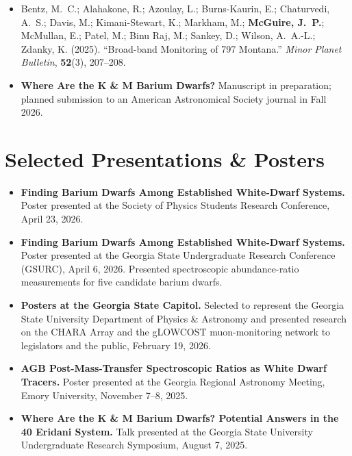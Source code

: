 \documentclass[10pt,a4paper]{article}
\newenvironment{items}
  {\begin{itemize}[leftmargin=1.2em,itemsep=0.6pt,topsep=1.5pt,parsep=0pt,
                   label=\textbullet]}
  {\end{itemize}}
\begin{document}
\begin{items}
  \item Bentz, M.~C.; Alahakone, R.; Azoulay, L.; Burns-Kaurin, E.; Chaturvedi, A.~S.;
        Davis, M.; Kimani-Stewart, K.; Markham, M.; \textbf{McGuire, J.~P.}; McMullan, E.;
        Patel, M.; Binu Raj, M.; Sankey, D.; Wilson, A.~A.-L.; Zdanky, K. (2025).
        ``Broad-band Monitoring of 797 Montana.'' \textit{Minor Planet Bulletin},
        \textbf{52}(3), 207--208.
  \item \textbf{Where Are the K \& M Barium Dwarfs?} Manuscript in preparation; planned
        submission to an American Astronomical Society journal in Fall 2026.
\end{items}

\section{Selected Presentations \& Posters}

\begin{items}
  \item \textbf{Finding Barium Dwarfs Among Established White-Dwarf Systems.} Poster
        presented at the Society of Physics Students Research Conference,
        April 23, 2026.
  \item \textbf{Finding Barium Dwarfs Among Established White-Dwarf Systems.} Poster
        presented at the Georgia State Undergraduate Research Conference (GSURC),
        April 6, 2026. Presented spectroscopic abundance-ratio measurements for five
        candidate barium dwarfs.
  \item \textbf{Posters at the Georgia State Capitol.} Selected to represent the Georgia
        State University Department of Physics \& Astronomy and presented research on the
        CHARA Array and the gLOWCOST muon-monitoring network to legislators and the
        public, February 19, 2026.
  \item \textbf{AGB Post-Mass-Transfer Spectroscopic Ratios as White Dwarf Tracers.}
        Poster presented at the Georgia Regional Astronomy Meeting, Emory University,
        November 7--8, 2025.
  \item \textbf{Where Are the K \& M Barium Dwarfs? Potential Answers in the 40 Eridani
        System.} Talk presented at the Georgia State University Undergraduate Research
        Symposium, August 7, 2025.
\end{items}
\end{document}
